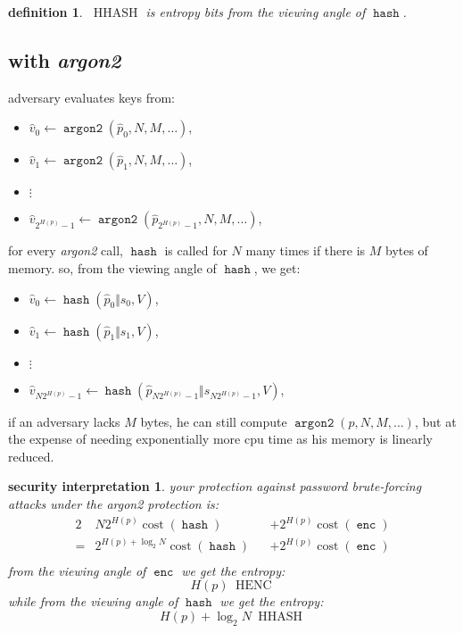 \documentclass[twocolumn]{article}
\newtheorem{security}{security interpretation}
\newtheorem{definition}{definition}
\DeclareMathOperator{\enc}{\mathtt{enc}}
\DeclareMathOperator{\hash}{\mathtt{hash}}
\DeclareMathOperator{\argon}{\mathtt{argon2}}
\DeclareMathOperator{\cost}{cost}
\DeclareMathOperator{\henc}{\; HENC}
\DeclareMathOperator{\hhash}{\; HHASH}
\begin{document}
\begin{definition}
$\hhash$ is entropy bits from the viewing angle of  $\hash$.
\end{definition}

\subsection{with \emph{argon2}}
adversary evaluates keys from:
\begin{itemize}
    \item $\hat v_0 \gets \argon(\hat p_0, N, M, \ldots)$,
    \item $\hat v_1 \gets \argon(\hat p_1, N, M, \ldots)$,
    \item $\vdots$
    \item $\hat v_{2^{H(p)}-1} \gets \argon(\hat p_{2^{H(p)}-1}, N, M,
    \ldots)$,
\end{itemize}

for every \emph{argon2} call, $\hash$ is called for $N$ many times if there
is $M$ bytes of memory.  so, from the viewing angle of $\hash$, we get:
\begin{itemize}
    \item $\hat v_0 \gets \hash(\hat p_0 \Vert s_0, V)$,
    \item $\hat v_1 \gets \hash(\hat p_1 \Vert s_1, V)$,
    \item $\vdots$
    \item $\hat v_{N2^{H(p)}-1} \gets \hash(\hat p_{N2^{H(p)}-1}
    \Vert s_{N2^{H(p)}-1}, V)$,
\end{itemize}

if an adversary lacks $M$ bytes, he can still compute $\argon(p, N, M,
\ldots)$, but at the expense of needing exponentially more cpu time as his
memory is linearly reduced.

\begin{security}
your protection against password brute-forcing attacks under the
\emph{argon2} protection is:
\begin{alignat*}{2}
        & N 2^{H(p)} \cost(\hash)          && + 2^{H(p)} \cost(\enc) \\
    ={} & 2^{H(p) + \log_2 N} \cost(\hash) && + 2^{H(p)} \cost(\enc) \\
\end{alignat*}
from the viewing angle of $\enc$ we get the entropy:
\[
    H(p) \henc
\]
while from the viewing angle of $\hash$ we get the entropy:
\[
    H(p) + \log_2 N \hhash
\]
\end{security}
\end{document}
